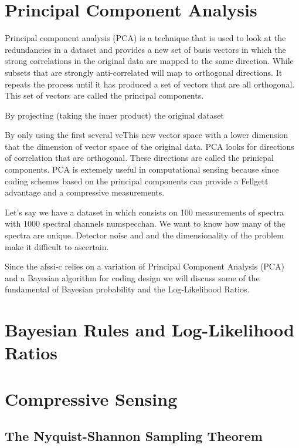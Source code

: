 \section{Principal Component Analysis}

Principal component analysis (PCA) is a technique that is used to look at the redundancies in a dataset and provides a new set of basis vectors in which the strong correlations in the original data are mapped to the same direction. While subsets that are strongly anti-correlated will map to orthogonal directions. It repeats the process until it has produced a set of vectors that are all orthogonal. This set of vectors are called the principal components. 

By projecting (taking the inner product) the original dataset 


By only using the first several veThis new vector space with a lower dimension that the dimension of vector space of the original data. PCA looks for directions of correlation that are orthogonal. These directions are called the prinicpal components. PCA is extemely useful in computational sensing because since coding schemes based on the principal components can provide a \gls{Fellgett advantage} and a compressive measurements. 

Let's say we have a dataset in which consists on 100 measurements of spectra with 1000 spectral channels \gls{numspecchan}. We want to know how many of the spectra are unique. Detector noise and and the dimensionality of the problem make it difficult to ascertain. 



Since the \gls{afssi-c} relies on a variation of Principal Component Analysis (PCA) and a Bayesian algorithm for coding design we will discuss some of the fundamental of Bayesian probability and the Log-Likelihood Ratios. 

\section{Bayesian Rules and Log-Likelihood Ratios}

\section{Compressive Sensing}



\subsection{The Nyquist-Shannon Sampling Theorem}

